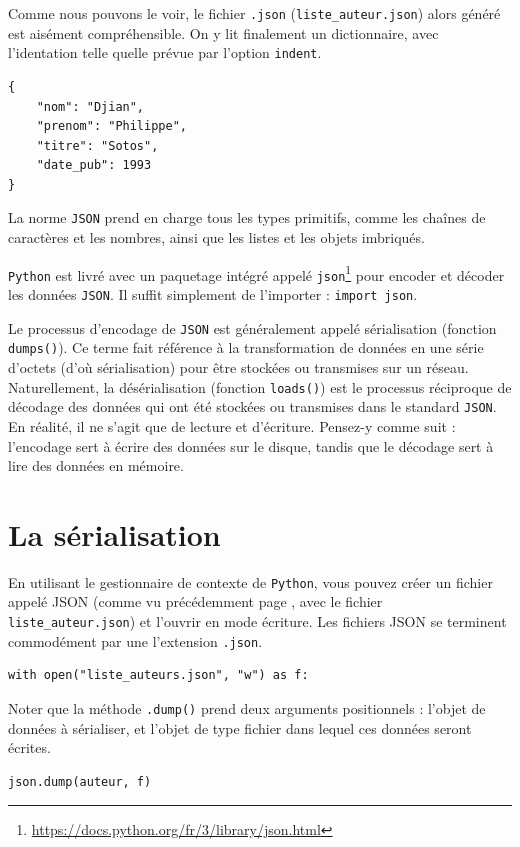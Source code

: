 \documentclass[a4paper,12pt]{book}
\begin{document}
Comme nous pouvons le voir, le fichier \texttt{.json} (\texttt{liste\_auteur.json}) alors généré est aisément compréhensible. On y lit  finalement un dictionnaire, avec l'identation telle quelle prévue par l'option \texttt{indent}.
\begin{lstlisting}[caption=Contenu d'un fichier \texttt{.json}]
{
    "nom": "Djian",
    "prenom": "Philippe",
    "titre": "Sotos",
    "date_pub": 1993
}
\end{lstlisting}
\medskip

La norme \texttt{JSON} prend en charge tous les types primitifs, comme les chaînes de caractères et les nombres, ainsi que les listes et les objets imbriqués.
\medskip

\texttt{Python} est livré avec un paquetage intégré appelé \texttt{json}\footnote{\url{https://docs.python.org/fr/3/library/json.html}} pour encoder et décoder les données \texttt{JSON}. Il suffit simplement de l'importer : \texttt{import json}.
\medskip

Le processus d'encodage de \texttt{JSON} est généralement appelé sérialisation (fonction \texttt{dumps()}). Ce terme fait référence à la transformation de données en une série d'octets (d'où sérialisation) pour être stockées ou transmises sur un réseau. Naturellement, la désérialisation (fonction \texttt{loads()}) est le processus réciproque de décodage des données qui ont été stockées ou transmises dans le standard \texttt{JSON}. En réalité, il ne s'agit que de lecture et d'écriture. Pensez-y comme suit : l'encodage sert à écrire des données sur le disque, tandis que le décodage sert à lire des données en mémoire.
\medskip

\section{La sérialisation}
En utilisant le gestionnaire de contexte de \texttt{Python}, vous pouvez créer un fichier appelé JSON (comme vu précédemment page \pageref{serialistionJSON}, avec le fichier \texttt{liste\_auteur.json}) et l'ouvrir en mode écriture. Les fichiers JSON se terminent commodément par une l'extension \texttt{.json}.
\begin{lstlisting}[caption=Créer un fichier \texttt{.json}]
with open("liste_auteurs.json", "w") as f:
\end{lstlisting}
\medskip

Noter que la méthode \texttt{.dump()} prend deux arguments positionnels : l'objet de données à sérialiser, et l'objet de type fichier dans lequel ces données seront écrites.
\begin{lstlisting}[caption=Ecriture des données]
	json.dump(auteur, f)
\end{lstlisting}
\medskip
\end{document}
